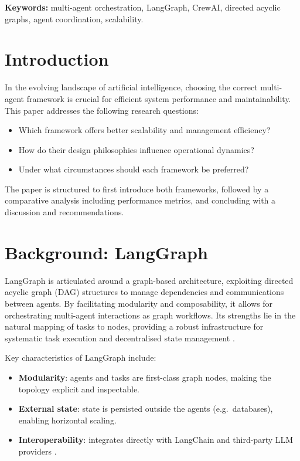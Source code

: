 \documentclass[12pt,a4paper]{article}
\begin{document}
\bigskip
\noindent\textbf{Keywords:} multi-agent orchestration, LangGraph, CrewAI,
directed acyclic graphs, agent coordination, scalability.

\newpage

\section{Introduction}

In the evolving landscape of artificial intelligence, choosing the correct
multi-agent framework is crucial for efficient system performance and
maintainability. This paper addresses the following research questions:

\begin{itemize}
    \item Which framework offers better scalability and management efficiency?
    \item How do their design philosophies influence operational dynamics?
    \item Under what circumstances should each framework be preferred?
\end{itemize}

The paper is structured to first introduce both frameworks, followed by a
comparative analysis including performance metrics, and concluding with a
discussion and recommendations.

\section{Background: LangGraph}

LangGraph is articulated around a graph-based architecture, exploiting directed
acyclic graph (DAG) structures to manage dependencies and communications between
agents. By facilitating modularity and composability, it allows for orchestrating
multi-agent interactions as graph workflows. Its strengths lie in the natural
mapping of tasks to nodes, providing a robust infrastructure for systematic task
execution and decentralised state management \cite{Smith2023LangGraph}.

Key characteristics of LangGraph include:
\begin{itemize}
    \item \textbf{Modularity}: agents and tasks are first-class graph nodes,
          making the topology explicit and inspectable.
    \item \textbf{External state}: state is persisted outside the agents
          (e.g.\ databases), enabling horizontal scaling.
    \item \textbf{Interoperability}: integrates directly with LangChain and
          third-party LLM providers \cite{LangGraph2023Docs}.
\end{itemize}
\end{document}
